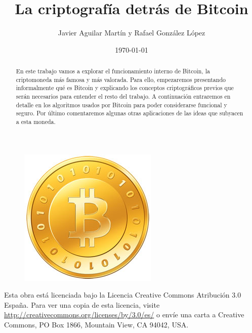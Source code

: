 \documentclass[twoside]{article}
\theoremstyle{definition}
\begin{document}

\author{Javier Aguilar Martín y Rafael González López}
\date{\today}
\title{La criptografía detrás de Bitcoin}

\maketitle

\begin{figure}[h!]
		\includegraphics[scale=0.7]{bitcoin.jpg}
\end{figure}

\begin{abstract}
    En este trabajo vamos a explorar el funcionamiento interno de Bitcoin, la criptomoneda más famosa y más valorada. Para ello, empezaremos presentando informalmente qué es Bitcoin y explicando los conceptos criptográficos previos que serán necesarios para entender el resto del trabajo. A continuación entraremos en detalle en los algoritmos usados por Bitcoin para poder considerarse funcional y seguro. Por último comentaremos algunas otras aplicaciones de las ideas que subyacen a esta moneda.
\end{abstract}


	\vfill
	Esta obra está licenciada bajo la Licencia Creative Commons Atribución 3.0 España. Para ver una copia de esta licencia, visite \url{http://creativecommons.org/licenses/by/3.0/es/} o envíe una carta a Creative Commons, PO Box 1866, Mountain View, CA 94042, USA.


\newpage
\tableofcontents
\end{document}
